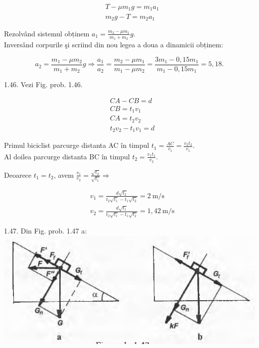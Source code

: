 \documentclass[10pt]{article}
\begin{document}
$$
\begin{aligned}
& T-\mu m_{1} g=m_{1} a_{1} \\
& m_{2} g-T=m_{2} a_{1}
\end{aligned}
$$

Rezolvând sistemul obținem $a_{1}=\frac{m_{2}-\mu m_{1}}{m_{1}+m_{2}} g$.\\
Inversând corpurile şi scriind din nou legea a doua a dinamicii obținem:

$$
a_{2}=\frac{m_{1}-\mu m_{2}}{m_{1}+m_{2}} g \Rightarrow \frac{a_{1}}{a_{2}}=\frac{m_{2}-\mu m_{1}}{m_{1}-\mu m_{2}}=\frac{3 m_{1}-0,15 m_{1}}{m_{1}-0,15 m_{1}}=5,18 .
$$

1.46. Vezi Fig. prob. 1.46.

$$
\begin{aligned}
& C A-C B=d \\
& C B=t_{1} v_{1} \\
& C A=t_{2} v_{2} \\
& t_{2} v_{2}-t_{1} v_{1}=d
\end{aligned}
$$

Primul biciclist parcurge distanta AC în timpul $t_{1}=\frac{A C}{v_{1}}=\frac{v_{2} t_{2}}{v_{1}}$.\\
Al doilea parcurge distanta BC în timpul $t_{2}=\frac{v_{1} t_{1}}{v_{2}}$.

Deoarece $t_{1}=t_{2}$, avem $\frac{v_{1}}{v_{2}}=\frac{\sqrt{t_{2}}}{\sqrt{t_{1}}} \Rightarrow$

$$
\begin{aligned}
& v_{1}=\frac{d \sqrt{t_{2}}}{t_{2} \sqrt{t_{1}}-t_{1} \sqrt{t_{2}}}=2 \mathrm{~m} / \mathrm{s} \\
& v_{2}=\frac{d \sqrt{t_{1}}}{t_{2} \sqrt{t_{1}}-t_{1} \sqrt{t_{2}}}=1,42 \mathrm{~m} / \mathrm{s}
\end{aligned}
$$

1.47. Din Fig. prob. 1.47 a:\\
\includegraphics[max width=\textwidth, center]{2025_07_01_5b3ff9fa0d508c8e9f17g-207}
\end{document}
